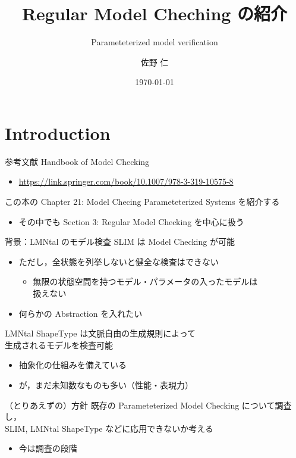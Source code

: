 \documentclass[presentation, xetex]{beamer}
\author{佐野 仁}
\date{\today{}}
\title{Regular Model Cheching の紹介}
\subtitle{Parameteterized model verification}
\begin{document}
\maketitle



\section{Introduction}
\label{sec:orgdf394bb}

\begin{frame}[label={sec:org4775004}]{参考文献}
Handbook of Model Checking
\begin{itemize}
\item \url{https://link.springer.com/book/10.1007/978-3-319-10575-8}
\end{itemize}


この本の Chapter 21: Model Checing Parameteterized Systems を紹介する
\begin{itemize}
\item その中でも Section 3: Regular Model Checking を中心に扱う
\end{itemize}
\end{frame}


\begin{frame}[label={sec:orged5e662}]{背景：LMNtal のモデル検査}
SLIM は Model Checking が可能
\begin{itemize}
\item ただし，全状態を列挙しないと健全な検査はできない
\begin{itemize}
\item 無限の状態空間を持つモデル・パラメータの入ったモデルは\\
扱えない
\end{itemize}
\item 何らかの \alert{\alert{Abstraction}} を入れたい
\end{itemize}


LMNtal ShapeType は文脈自由の生成規則によって\\
生成されるモデルを検査可能
\begin{itemize}
\item 抽象化の仕組みを備えている
\item が，まだ未知数なものも多い（性能・表現力）
\end{itemize}
\end{frame}


\begin{frame}[label={sec:org15380e5}]{（とりあえずの）方針}
既存の \alert{\alert{Parameteterized Model Checking}} について調査し，\\
SLIM, LMNtal ShapeType などに応用できないか考える
\begin{itemize}
\item 今は調査の段階
\end{itemize}
\end{frame}
\end{document}

